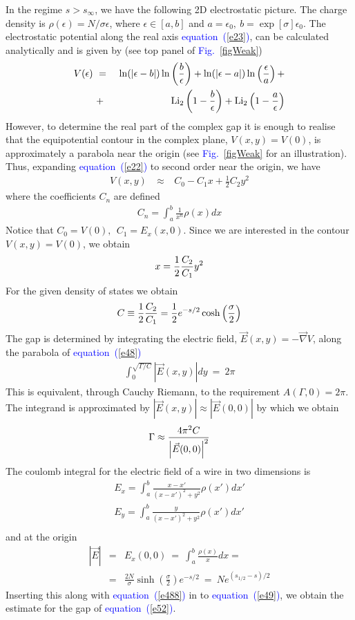 \documentclass[aps,pre,floats,floatfix,twocolumn]{revtex4}
\newcommand{\be}[1]{\begin{eqnarray}\ifthenelse{#1=-1}{\nonumber}{\ifthenelse{#1=0}{}{\label{e#1}}}}
\newcommand{\beq}{\begin{eqnarray}}
\newcommand{\eeq}{\end{eqnarray}}
\newcommand{\Eq}[1]{\textcolor{blue}{{equation}\!~(\ref{#1})}}
\newcommand{\Fig}[1]{\textcolor{blue}{Fig.}\!\!~\ref{#1}}
\begin{document}
In the regime $s>s_{\infty}$, we have the following 2D electrostatic picture.
The charge density is $\rho(\epsilon) = N/\sigma\epsilon$, where $\epsilon \in [a,b]$ and 
${a=\epsilon_0,  \ b =  \exp[\sigma]\epsilon_0}$. 
The electrostatic potential along the real axis \Eq{e23}, can be calculated analytically and is given by
(see top panel of \Fig{figWeak})
%
\be{43}
 V(\epsilon) \  &=& \ 
 \ln(| \epsilon - b|) \ln\left(\frac{b}{\epsilon}\right) + \ln(|\epsilon-a|) \ln \left(\frac{\epsilon}{a}\right) +\\
 &+&
   \text{Li}_2\left( 1 -\frac{b}{\epsilon}\right) + \text{Li}_2\left( 1-\frac{a}{\epsilon}\right) 
\eeq
%
However, to determine the real part of the complex gap it is enough to realise 
that the equipotential contour in the complex plane, $V(x,y) =V(0)$,
 is approximately a parabola near the origin (see \Fig{figWeak} for an illustration).
Thus, expanding \Eq{e22} to second order near the origin, we have 
%
\beq
V(x,y)
\ &\approx & \ C_0 - C_1 x +\frac{1}{2}C_2y^2 
\eeq
%
where the coefficients $C_n$ are defined 
%
\beq
C_n = \int_a^b \frac{1}{x^n}\rho(x)dx
\eeq
%
Notice that $C_0 = V(0), \ \ C_1 = E_x(x,0)$.
Since we are interested in the contour $V(x,y) = V(0)$, we obtain
%
\be{48}
x = \frac{1}{2}\frac{C_2}{C_1} y^2 
\eeq
%
For the given density of states we obtain 
%
\be{488}
C \equiv  \frac{1}{2}\frac{C_2}{C_1} = \frac{1}{2} e^{-s/2}\cosh\left(\frac{\sigma}{2}\right) 
\eeq
%
The gap is determined by integrating the electric field, $\vec{E}(x,y) = - \vec{\nabla } V$, along the parabola of \Eq{e48}
%
\beq
\int_{0}^{\sqrt{\Gamma/C}} \left|\vec{E}(x,y)\right| dy \ = \ 2\pi
\eeq
%
This is equivalent, through Cauchy Riemann, to the requirement $A(\Gamma,0)=2\pi$.
%
The integrand is approximated by $|\vec{E}(x,y)| \approx |\vec{E}(0,0)|$ by which we obtain
%
\be{49}
\Gamma\approx \frac{4\pi^2 C}{ \left|\vec{E}(0,0) \right|^2}
\eeq
%
The coulomb integral for the electric field of a wire in two dimensions is
%
\beq
E_x = \int_a^b \frac{x-x'}{(x-x')^2 + y^2}\rho(x')dx' \\
E_y = \int_a^b \frac{y}{(x-x')^2 + y^2}\rho(x')dx' \\
\eeq
%
and at the origin
%
\beq
|\vec{E}| & = & E_x(0,0) \ = \  \int_a^b \frac{\rho(x)}{x}dx =\\
&=&\frac{2N}{\sigma} \sinh \left( \frac{\sigma}{2} \right) e^{-s/2} \ = \ Ne^{(s_{1/2}-s)/2}
\eeq
%
Inserting this along with \Eq{e488} in to \Eq{e49}, we obtain
the estimate for the gap of \Eq{e52}.
\end{document}
